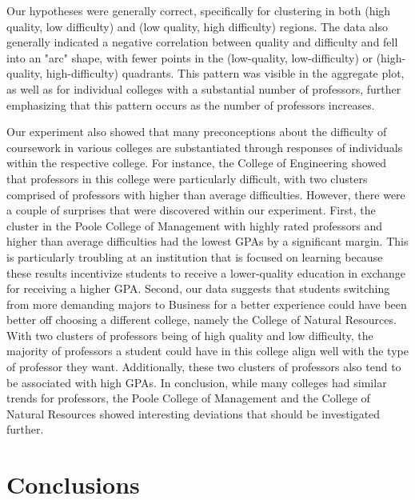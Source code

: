 \documentclass[sigconf,nonacm]{acmart}
\begin{document}
Our hypotheses were generally correct, specifically for clustering in both (high quality, low difficulty) and (low quality, high difficulty) regions. The data also generally indicated a negative correlation between quality and difficulty and fell into an "arc" shape, with fewer points in the (low-quality, low-difficulty) or (high-quality, high-difficulty) quadrants. This pattern was visible in the aggregate plot, as well as for individual colleges with a substantial number of professors, further emphasizing that this pattern occurs as the number of professors increases.

Our experiment also showed that many preconceptions about the difficulty of coursework in various colleges are substantiated through responses of individuals within the respective college. For instance, the College of Engineering showed that professors in this college were particularly difficult, with two clusters comprised of professors with higher than average difficulties. However, there were a couple of surprises that were discovered within our experiment. First, the cluster in the Poole College of Management with highly rated professors and higher than average difficulties had the lowest GPAs by a significant margin. This is particularly troubling at an institution that is focused on learning because these results incentivize students to receive a lower-quality education in exchange for receiving a higher GPA. Second, our data suggests that students switching from more demanding majors to Business for a better experience could have been better off choosing a different college, namely the College of Natural Resources. With two clusters of professors being of high quality and low difficulty, the majority of professors a student could have in this college align well with the type of professor they want. Additionally, these two clusters of professors also tend to be associated with high GPAs. In conclusion, while many colleges had similar trends for professors, the Poole College of Management and the College of Natural Resources showed interesting deviations that should be investigated further.

\section{Conclusions}
\end{document}
